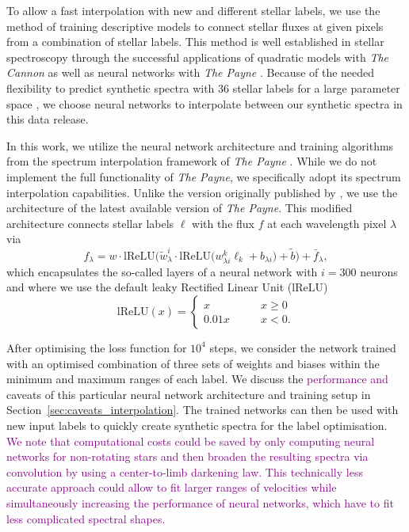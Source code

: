 \documentclass[
  journal=pasa,
  manuscript=research-paper, %
  year=2024,
  volume=37
]{cup-journal}
\newcommand{\adjusted}[1]{{\textcolor{purple}{#1}}}
\begin{document}
To allow a fast interpolation with new and different stellar labels, we use the method of training descriptive models to connect stellar fluxes at given pixels from a combination of stellar labels. This method is well established in stellar spectroscopy through the successful applications of quadratic models with \textit{The Cannon} \citep[see e.g.][]{Ness2015, Ness2016, Casey2016, Casey2017, Ho2017, Buder2018} as well as neural networks with \textit{The Payne} \citep[see e.g.][]{Ting2019, Xiang2019, Xiang2021}. Because of the needed flexibility to predict synthetic spectra with 36 stellar labels for a large parameter space \citep[for a detailled discussion of advantages of neural networks over quadratic models see][]{Ting2019}, we choose neural networks to interpolate between our synthetic spectra in this data release.

In this work, we utilize the neural network architecture and training algorithms from the spectrum interpolation framework of \textit{The Payne} \citep{Ting2019}. While we do not implement the full functionality of \textit{The Payne}, we specifically adopt its spectrum interpolation capabilities. Unlike the version originally published by \citet{Ting2019}, we use the architecture of the latest available version of \textit{The Payne}. This modified architecture connects stellar labels $\boldsymbol{\ell}$ with the flux $f$ at each wavelength pixel $\lambda$ via
\begin{equation}
f_\lambda = w \cdot \mathrm{lReLU} \bigg( \tilde{w}_\lambda^i \cdot \mathrm{lReLU}  \Big( w^k_{\lambda i} \ell_k + b_{\lambda i} \Big) + \tilde{b} \bigg) + \bar{f}_\lambda,
\label{eq:neural_network_function}
\end{equation}
which encapsulates the so-called layers of a neural network with $i = 300$ neurons and where we use the default leaky Rectified Linear Unit ($\mathrm{lReLU}$)
\begin{equation}
    \mathrm{lReLU} (x) =  \begin{cases}
        x \qquad &x \geq 0 \\
        0.01 x \qquad &x < 0.
    \end{cases}
\end{equation}

After optimising the loss function for $10^4$ steps, we consider the network trained with an optimised combination of three sets of weights and biases within the minimum and maximum ranges of each label. We discuss the \adjusted{performance and }caveats of this particular neural network architecture and training setup in Section~\ref{sec:caveats_interpolation}. The trained networks can then be used with new input labels to quickly create synthetic spectra for the label optimisation. \adjusted{We note that computational costs could be saved by only computing neural networks for non-rotating stars and then broaden the resulting spectra via convolution by using a center-to-limb darkening law. This technically less accurate approach could allow to fit larger ranges of velocities while simultaneously increasing the performance of neural networks, which have to fit less complicated spectral shapes.}
\end{document}
